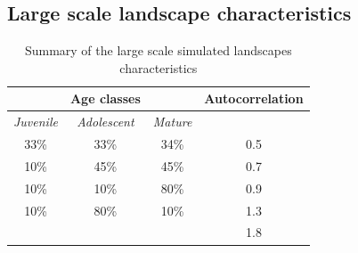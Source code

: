 
\subsection{Large scale landscape characteristics}

\begin{table}[H]
\centering
\begin{tabular}{|ccc||c|}
\hline
 & Age classes &  & Autocorrelation \\
\hline
\textit{Juvenile}& \textit{Adolescent}& \textit{Mature}& \\
\hline
33\% & 33\% & 34\% & 0.5 \\
10\% & 45\% & 45\% & 0.7 \\
10\% & 10\% & 80\% & 0.9 \\
10\% & 80\% & 10\% & 1.3 \\
& & & 1.8\\
\hline
\end{tabular}
\caption{Summary of the large scale simulated landscapes characteristics}
\label{tab:composition_nlm}
\end{table}
\clearpage

